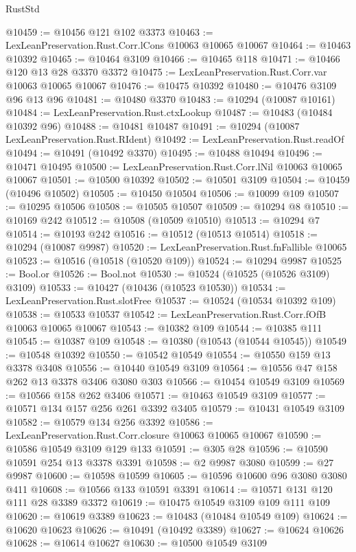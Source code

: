 \begin{lexlean}{RustStd}
\begin{coremodule}
@10459 := @10456 @121 @102 @3373
@10463 := LexLeanPreservation.Rust.Corr.lCons @10063 @10065 @10067
@10464 := @10463 @10392
@10465 := @10464 @3109
@10466 := @10465 @118
@10471 := @10466 @120 @13 @28 @3370 @3372
@10475 := LexLeanPreservation.Rust.Corr.var @10063 @10065 @10067
@10476 := @10475 @10392
@10480 := @10476 @3109 @96 @13 @96
@10481 := @10480 @3370
@10483 := @10294 (@10087 @10161)
@10484 := LexLeanPreservation.Rust.ctxLookup
@10487 := @10483 (@10484 @10392 @96)
@10488 := @10481 @10487
@10491 := @10294 (@10087 LexLeanPreservation.Rust.RIdent)
@10492 := LexLeanPreservation.Rust.readOf
@10494 := @10491 (@10492 @3370)
@10495 := @10488 @10494
@10496 := @10471 @10495
@10500 := LexLeanPreservation.Rust.Corr.lNil @10063 @10065 @10067
@10501 := @10500 @10392
@10502 := @10501 @3109
@10504 := @10459 (@10496 @10502)
@10505 := @10450 @10504
@10506 := @10099 @109
@10507 := @10295 @10506
@10508 := @10505 @10507
@10509 := @10294 @8
@10510 := @10169 @242
@10512 := @10508 (@10509 @10510)
@10513 := @10294 @7
@10514 := @10193 @242
@10516 := @10512 (@10513 @10514)
@10518 := @10294 (@10087 @9987)
@10520 := LexLeanPreservation.Rust.fnFallible @10065
@10523 := @10516 (@10518 (@10520 @109))
@10524 := @10294 @9987
@10525 := Bool.or
@10526 := Bool.not
@10530 := @10524 (@10525 (@10526 @3109) @3109)
@10533 := @10427 (@10436 (@10523 @10530))
@10534 := LexLeanPreservation.Rust.slotFree
@10537 := @10524 (@10534 @10392 @109)
@10538 := @10533 @10537
@10542 := LexLeanPreservation.Rust.Corr.fOfB @10063 @10065 @10067
@10543 := @10382 @109
@10544 := @10385 @111
@10545 := @10387 @109
@10548 := @10380 (@10543 (@10544 @10545))
@10549 := @10548 @10392
@10550 := @10542 @10549
@10554 := @10550 @159 @13 @3378 @3408
@10556 := @10440 @10549 @3109
@10564 := @10556 @47 @158 @262 @13 @3378 @3406 @3080 @303
@10566 := @10454 @10549 @3109
@10569 := @10566 @158 @262 @3406
@10571 := @10463 @10549 @3109
@10577 := @10571 @134 @157 @256 @261 @3392 @3405
@10579 := @10431 @10549 @3109
@10582 := @10579 @134 @256 @3392
@10586 := LexLeanPreservation.Rust.Corr.closure @10063 @10065 @10067
@10590 := @10586 @10549 @3109 @129 @133
@10591 := @305 @28
@10596 := @10590 @10591 @254 @13 @3378 @3391
@10598 := @2 @9987 @3080
@10599 := @27 @9987
@10600 := @10598 @10599
@10605 := @10596 @10600 @96 @3080 @3080 @411
@10608 := @10566 @133 @10591 @3391
@10614 := @10571 @131 @120 @111 @28 @3389 @3372
@10619 := @10475 @10549 @3109 @109 @111 @109
@10620 := @10619 @3389
@10623 := @10483 (@10484 @10549 @109)
@10624 := @10620 @10623
@10626 := @10491 (@10492 @3389)
@10627 := @10624 @10626
@10628 := @10614 @10627
@10630 := @10500 @10549 @3109

\end{coremodule}
\end{lexlean}
